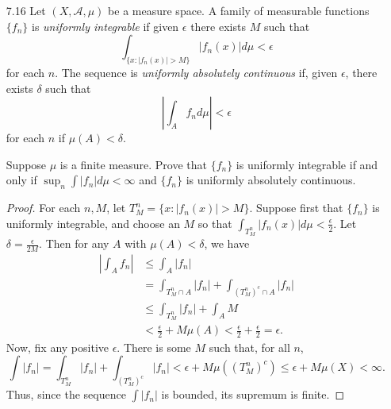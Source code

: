 \documentclass[10pt]{article}
\newcommand{\Int}{{\displaystyle \int}}
\newcommand{\A}{\mathcal{A}}
\begin{document}
\begin{enumerate}
\begin{proof}
Assume $x \in [0,1]$.  Note that $0 < 1+nx^2 \leq \sum_{k=0}^n \binom{n}{k}x^{2n} = (1+x^2)^n$, therefore $0 < \left|\frac{1+nx^2}{(1+x^2)^n}\right| \leq 1$.  Also, $0 < \cos(x/n) \leq 1$, so $0 < |\log(2 + \cos(x/n))| \leq \log(3)$.  So if $f_n$ is the integrand, then $|f_n| \leq \log(3)$, hence we may apply the dominated convergence theorem.

Since $\{0\}$ is a null set, the expression equals $\lim_{n \rightarrow \infty} \Int_{(0,1]} f_n$.  Applying L'Hospital's rule to the first factor by differentiating with respect to $n$ gives
$$
\lim_{n \rightarrow \infty} \frac{1+nx^2}{(1+x^2)^n} = \lim_{n \rightarrow \infty} \frac{x^2}{\log(1+x^2)(1+x^2)^n} =  \frac{x^2}{\log(1+x^2)}\lim_{n \rightarrow \infty} \frac{1}{(1+x^2)^n} = 0.
$$
The limit of the second factor is clearly $\log 3$, which is finite.  So the limit of the integrand is the product of the limits of these factors, which is $0$.  Thus, by the dominated convergence theorem, the expression equals $\Int_{(0,1]} 0 = 0$.
\end{proof}

\item[7.16] Let $(X, \A, \mu)$ be a measure space.  A family of measurable functions $\{f_n\}$ is \emph{uniformly integrable} if given $\epsilon$ there exists $M$ such that
$$
\Int_{\{x : |f_n(x)| > M\}} |f_n(x)| d\mu < \epsilon
$$
for each $n$.  The sequence is \emph{uniformly absolutely continuous} if, given $\epsilon$, there exists $\delta$ such that
$$
\left| \Int_A f_n d\mu \right| < \epsilon
$$
for each $n$ if $\mu(A) < \delta$.

Suppose $\mu$ is a finite measure.  Prove that $\{f_n\}$ is uniformly integrable if and only if $\sup_n \Int |f_n| d\mu < \infty$ and $\{f_n\}$ is uniformly absolutely continuous.

\begin{proof}
For each $n, M$, let $T_M^n = \{x : |f_n(x)| > M\}$.  Suppose first that $\{f_n\}$ is uniformly integrable, and choose an $M$ so that $\Int_{T_M^n} |f_n(x)| d\mu < \frac{\epsilon}{2}$.  Let $\delta = \frac{\epsilon}{2M}$.  Then for any $A$ with $\mu(A) < \delta$, we have
\begin{align*}
\left| \Int_A f_n \right| &\leq \Int_A |f_n| \\
&= \Int_{T_M^n \cap A} |f_n| + \Int_{(T_M^n)^c \cap A} |f_n| \\
&\leq \Int_{T_M^n} |f_n| + \Int_{A} M \\
&< \frac{\epsilon}{2} + M\mu(A)
< \frac{\epsilon}{2} + \frac{\epsilon}{2} = \epsilon.
\end{align*}
Now, fix any positive $\epsilon$.  There is some $M$ such that, for all $n$, $$\Int |f_n| = \Int_{T_M^n} |f_n| + \Int_{(T_M^n)^c} |f_n| < \epsilon + M\mu((T_M^n)^c) \leq \epsilon + M\mu(X) < \infty.$$  Thus, since the sequence $\Int |f_n|$ is bounded, its supremum is finite.


\end{proof}
\end{enumerate}
\end{document}
